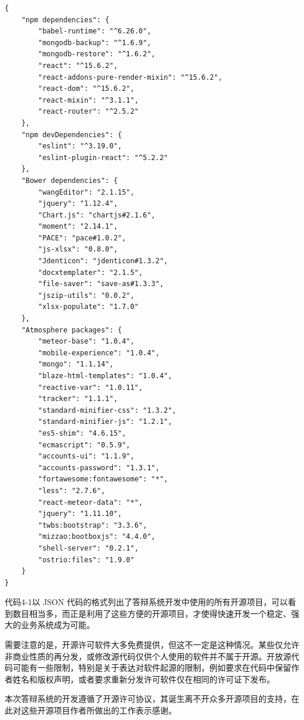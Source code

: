 \begin{lstlisting}[title=代码 4-1：答辩系统所选用的全部开源项目列表]
{
	"npm dependencies": {
		"babel-runtime": "^6.26.0",
		"mongodb-backup": "^1.6.9",
		"mongodb-restore": "^1.6.2",
		"react": "^15.6.2",
		"react-addons-pure-render-mixin": "^15.6.2",
		"react-dom": "^15.6.2",
		"react-mixin": "^3.1.1",
		"react-router": "^2.5.2"
	},
	"npm devDependencies": {
		"eslint": "^3.19.0",
		"eslint-plugin-react": "^5.2.2"
	},
	"Bower dependencies": {
		"wangEditor": "2.1.15",
		"jquery": "1.12.4",
		"Chart.js": "chartjs#2.1.6",
		"moment": "2.14.1",
		"PACE": "pace#1.0.2",
		"js-xlsx": "0.8.0",
		"Jdenticon": "jdenticon#1.3.2",
		"docxtemplater": "2.1.5",
		"file-saver": "save-as#1.3.3",
		"jszip-utils": "0.0.2",
		"xlsx-populate": "1.7.0"
	},
	"Atmosphere packages": {
		"meteor-base": "1.0.4",
		"mobile-experience": "1.0.4",
		"mongo": "1.1.14",
		"blaze-html-templates": "1.0.4",
		"reactive-var": "1.0.11",
		"tracker": "1.1.1",
		"standard-minifier-css": "1.3.2",
		"standard-minifier-js": "1.2.1",
		"es5-shim": "4.6.15",
		"ecmascript": "0.5.9",
		"accounts-ui": "1.1.9",
		"accounts-password": "1.3.1",
		"fortawesome:fontawesome": "*",
		"less": "2.7.6",
		"react-meteor-data": "*",
		"jquery": "1.11.10",
		"twbs:bootstrap": "3.3.6",
		"mizzao:bootboxjs": "4.4.0",
		"shell-server": "0.2.1",
		"ostrio:files": "1.9.0"
	}
}
\end{lstlisting}

代码4-1以 JSON 代码的格式列出了答辩系统开发中使用的所有开源项目，可以看到数目相当多，而正是利用了这些方便的开源项目，才使得快速开发一个稳定、强大的业务系统成为可能。

需要注意的是，开源许可软件大多免费提供，但这不一定是这种情况。某些仅允许非商业性质的再分发，或修改源代码仅供个人使用的软件并不属于开源。开放源代码可能有一些限制，特别是关于表达对软件起源的限制，例如要求在代码中保留作者姓名和版权声明，或者要求重新分发许可软件仅在相同的许可证下发布。

本次答辩系统的开发遵循了开源许可协议，其诞生离不开众多开源项目的支持，在此对这些开源项目作者所做出的工作表示感谢。
